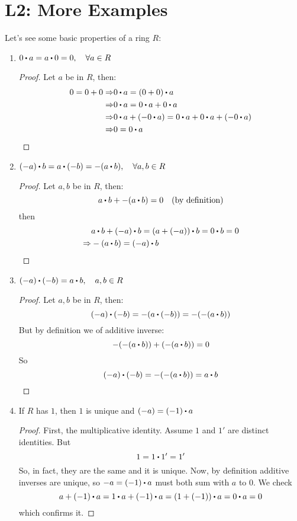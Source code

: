 \documentclass[../Main.tex]{subfiles}
\begin{document}
\chapter{L2: More Examples}
Let's see some basic properties of a ring $R$:
\begin{enumerate}
	\item $0\rdot a= a\rdot 0=0, \quad \forall a \in R$
	\begin{proof}
		Let $a$ be in $R$, then:
		\begin{align*}
			0=0+0\Rightarrow & 0\rdot a = (0+0)\rdot a  \\
			\Rightarrow& 0 \rdot a= 0\rdot a + 0\rdot a   \\
			\Rightarrow& 0\rdot a +(-0\rdot a) = 0\rdot a + 0\rdot a + (-0\rdot a)  \\
			\Rightarrow& 0 = 0 \rdot a\qedhere
		\end{align*}
	\end{proof}
	\item $(-a)\rdot b = a\rdot (-b) = -(a\rdot b), \quad \forall a,b \in R$
	\begin{proof}
		Let $a,b$ be in $R$, then:
		\[a\rdot b + -(a \rdot b) = 0 \quad \textrm{(by definition)}\]
		then
		\begin{align*}
			&a\rdot b +(-a)\rdot b = (a+(-a))\rdot b = 0\rdot b=0\\
			\Rightarrow& -(a\rdot b) = (-a)\rdot b\qedhere
		\end{align*}
	\end{proof}
	\item $(-a)\rdot (-b)=a\rdot b, \quad a,b \in R$
	\begin{proof}
		Let $a,b$ be in $R$, then:
		\[(-a)\rdot (-b) = - (a\rdot (-b)) = -(-(a\rdot b)) \]
		But by definition we of additive inverse:
			\[-(-(a\rdot b))+(-(a\rdot b))=0\]
		So
		\[(-a)\rdot (-b)=-(-(a\rdot b))=a\rdot b\qedhere\]	
	\end{proof}
	\item If $R$ has $1$, then $1$ is unique and $(-a) = (-1)\rdot a$
	\begin{proof}
		First, the multiplicative identity. Assume $1$ and $1'$ are distinct identities. But
		\[1= 1\rdot 1'=1'\]
		So, in fact, they are the same and it is unique.\newline
		Now, by definition additive inverses are unique, so $-a = (-1)\rdot a$ must both sum with $a$ to $0$. We check 
		\[a+(-1)\rdot a = 1\rdot a + (-1) \rdot  a = (1+(-1))\rdot a = 0\rdot a = 0\]
		which confirms it.
	\end{proof}
\end{enumerate}
\end{document}
